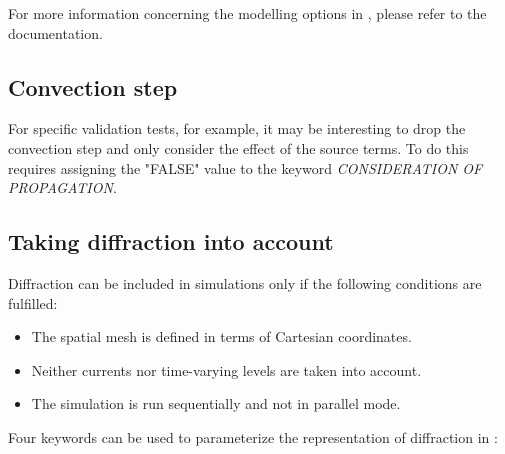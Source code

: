 For more information concerning the modelling options in \telemac{}, please refer to the \telemac{} documentation.

\subsection{ Convection step}

For specific validation tests, for example, it may be interesting to drop the convection step and only consider the effect of the
source terms. To do this requires assigning the "FALSE" value to the keyword \textit{CONSIDERATION OF PROPAGATION}.


\subsection{ Taking diffraction into account}

 Diffraction can be included in \tomawac simulations only if the following conditions are fulfilled:
\begin{itemize}

\item The spatial mesh is defined in terms of Cartesian coordinates.

 \item Neither currents nor time-varying levels are taken into account.

 \item The simulation is run sequentially and not in parallel mode.
\end{itemize}

Four keywords can be used to parameterize the representation of diffraction in \tomawac:

